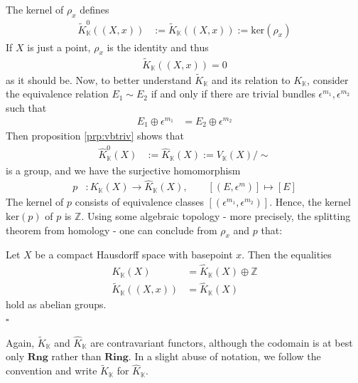 The kernel of $\rho_{x}$ defines
\begin{align*}
  \tilde{K}_{\mathbb{K}}^{0}((X,x))
  &:=
  \tilde{K}_{\mathbb{K}}((X,x))
  :=
  \mathrm{ker}(\rho_{x})
\end{align*}
If $X$ is just a point, $\rho_{x}$ is the identity and thus
\begin{align*}
  \tilde{K}_{\mathbb{K}}((X,x))
  =
  0
\end{align*}
as it should be.
Now, to better understand $\tilde{K}_{\mathbb{K}}$ and its relation to $K_{\mathbb{K}}$, consider the equivalence relation $E_{1} \sim E_{2}$ if and only if there are trivial bundles $\epsilon^{m_{1}},\epsilon^{m_{2}}$ such that
\begin{align*}
  E_{1}
  \oplus
  \epsilon^{m_{1}}
  &=
  E_{2}
  \oplus
  \epsilon^{m_{2}}
\end{align*}
Then proposition \ref{prp:vbtriv} shows that
\begin{align*}
  \hat{K}_{\mathbb{K}}^{0}(X)
  &:=
  \hat{K}_{\mathbb{K}}(X)
  :=
  V_{\mathbb{K}}(X)/\sim
\end{align*}
is a group, and we have the surjective homomorphism
\begin{align*}
  p
  &\colon
  K_{\mathbb{K}}(X)
  \to
  \hat{K}_{\mathbb{K}}(X)
  ,\qquad
  [(E,\epsilon^{m})]
  \mapsto
  [E]
\end{align*}
The kernel of $p$ consists of equivalence classes $[(\epsilon^{m_{1}},\epsilon^{m_{2}})]$.
Hence, the kernel $\mathrm{ker}(p)$ of $p$ is $\mathbb{Z}$.
Using some algebraic topology - more precisely, the splitting theorem from homology - one can conclude from $\rho_{x}$ and $p$ that:
\\
\begin{prp}
\label{prp:factor}
Let $X$ be a compact Hausdorff space with basepoint $x$.
Then the equalities
\begin{align*}
  K_{\mathbb{K}}(X)
  &=
  \hat{K}_{\mathbb{K}}(X) \oplus \mathbb{Z}
  \\
  \tilde{K}_{\mathbb{K}}((X,x))
  &= \hat{K}_{\mathbb{K}}(X)
\end{align*}
hold as abelian groups.
\\
\phantom{proven}
\hfill
$\square$
\end{prp}
Again, $\tilde{K}_{\mathbb{K}}$ and $\hat{K}_{\mathbb{K}}$ are contravariant functors, although the codomain is at best only $\mathbf{Rng}$ rather than $\mathbf{Ring}$.
In a slight abuse of notation, we follow the convention and write $\tilde{K}_{\mathbb{K}}$ for $\hat{K}_{\mathbb{K}}$.
\\

